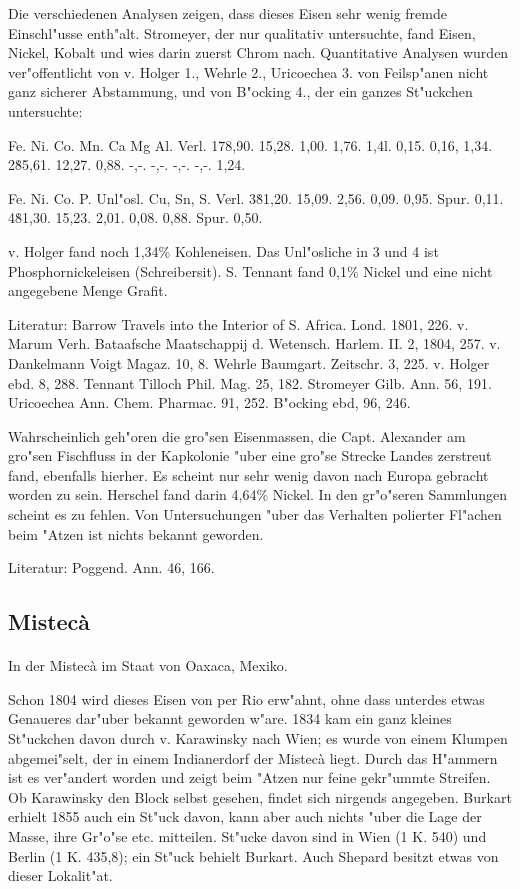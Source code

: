 \documentclass[a4paper, 11pt, oneside]{article}
\begin{document}
Die verschiedenen Analysen zeigen, dass dieses Eisen sehr wenig fremde Einschl"usse enth"alt. Stromeyer, der nur qualitativ untersuchte, fand Eisen, Nickel, Kobalt und wies darin zuerst Chrom nach. Quantitative Analysen wurden ver"offentlicht von v. Holger 1., Wehrle 2., Uricoechea 3. von Feilsp"anen nicht ganz sicherer Abstammung, und von B"ocking 4., der ein ganzes St"uckchen untersuchte:

Fe. Ni. Co. Mn. Ca Mg Al. Verl.  
1\. 78,90. 15,28. 1,00. 1,76. 1,4l. 0,15. 0,16, 1,34.  
2\. 85,61. 12,27. 0,88. -,-. -,-. -,-. -,-. 1,24.

Fe. Ni. Co. P. Unl"osl. Cu, Sn, S. Verl.  
3\. 81,20. 15,09. 2,56. 0,09. 0,95. Spur. 0,11.  
4\. 81,30. 15,23. 2,01. 0,08. 0,88. Spur. 0,50.

v. Holger fand noch 1,34\% Kohleneisen. Das Unl"osliche in 3 und 4 ist Phosphornickeleisen (Schreibersit). S. Tennant fand 0,1\% Nickel und eine nicht angegebene Menge Grafit.

Literatur: Barrow Travels into the Interior of S. Africa. Lond. 1801, 226. v. Marum Verh. Bataafsche Maatschappij d. Wetensch. Harlem. II. 2, 1804, 257. v. Dankelmann Voigt Magaz. 10, 8. Wehrle Baumgart. Zeitschr. 3, 225. v. Holger ebd. 8, 288. Tennant Tilloch Phil. Mag. 25, 182. Stromeyer Gilb. Ann. 56, 191. Uricoechea Ann. Chem. Pharmac. 91, 252. B"ocking ebd, 96, 246.

Wahrscheinlich geh"oren die gro"sen Eisenmassen, die Capt. Alexander am gro"sen Fischfluss in der Kapkolonie "uber eine gro"se Strecke Landes zerstreut fand, ebenfalls hierher. Es scheint nur sehr wenig davon nach Europa gebracht worden zu sein. Herschel fand darin 4,64\% Nickel. In den gr"o"seren Sammlungen scheint es zu fehlen. Von Untersuchungen "uber das Verhalten polierter Fl"achen beim "Atzen ist nichts bekannt geworden.

Literatur: Poggend. Ann. 46, 166.

\subsection{Mistecà}
\normalsize
\paragraph{}
In der Mistecà im Staat von Oaxaca, Mexiko.

Schon 1804 wird dieses Eisen von per Rio erw"ahnt, ohne dass unterdes etwas Genaueres dar"uber bekannt geworden w"are. 1834 kam ein ganz kleines St"uckchen davon durch v. Karawinsky nach Wien; es wurde von einem Klumpen abgemei"selt, der in einem Indianerdorf der Mistecà liegt. Durch das H"ammern ist es ver"andert worden und zeigt beim "Atzen nur feine gekr"ummte Streifen. Ob Karawinsky den Block selbst gesehen, findet sich nirgends angegeben. Burkart erhielt 1855 auch ein St"uck davon, kann aber auch nichts "uber die Lage der Masse, ihre Gr"o"se etc. mitteilen. St"ucke davon sind in Wien (1 K. 540) und Berlin (1 K. 435,8); ein St"uck behielt Burkart. Auch Shepard besitzt etwas von dieser Lokalit"at.
\end{document}
